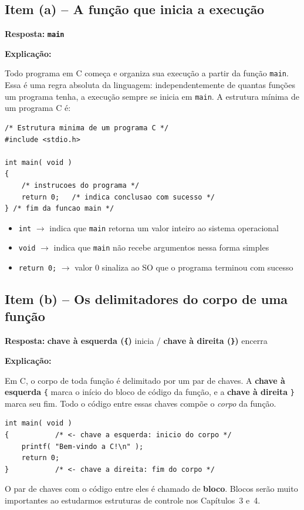 \documentclass[12pt,a4paper]{article}
\begin{document}
\bigskip

\subsection*{Item (a) -- A função que inicia a execução}

\begin{respostabox}
\textbf{Resposta:} \textcolor{deitelblue}{\textbf{\texttt{main}}}

\medskip\textbf{Explicação:}

Todo programa em C começa e organiza sua execução a partir da função \texttt{main}. Essa é
uma regra absoluta da linguagem: independentemente de quantas funções um programa tenha,
a execução sempre se inicia em \texttt{main}. A estrutura mínima de um programa C é:

\begin{lstlisting}
/* Estrutura minima de um programa C */
#include <stdio.h>

int main( void )
{
    /* instrucoes do programa */
    return 0;   /* indica conclusao com sucesso */
} /* fim da funcao main */
\end{lstlisting}

\begin{itemize}
  \item \texttt{int} $\to$ indica que \texttt{main} retorna um valor inteiro ao sistema operacional
  \item \texttt{void} $\to$ indica que \texttt{main} não recebe argumentos nessa forma simples
  \item \texttt{return 0;} $\to$ valor 0 sinaliza ao SO que o programa terminou com sucesso
\end{itemize}
\end{respostabox}

\subsection*{Item (b) -- Os delimitadores do corpo de uma função}

\begin{respostabox}
\textbf{Resposta:} \textcolor{deitelblue}{\textbf{chave à esquerda (\texttt{\{})} inicia / \textbf{chave à direita (\texttt{\}})} encerra}

\medskip\textbf{Explicação:}

Em C, o corpo de toda função é delimitado por um par de chaves. A \textbf{chave à esquerda}
\texttt{\{} marca o início do bloco de código da função, e a \textbf{chave à direita} \texttt{\}}
marca seu fim. Todo o código entre essas chaves compõe o \textit{corpo} da função.

\begin{lstlisting}
int main( void )
{           /* <- chave a esquerda: inicio do corpo */
    printf( "Bem-vindo a C!\n" );
    return 0;
}           /* <- chave a direita: fim do corpo */
\end{lstlisting}

O par de chaves com o código entre eles é chamado de \textbf{bloco}. Blocos serão
muito importantes ao estudarmos estruturas de controle nos Capítulos~3 e~4.
\end{respostabox}
\end{document}
